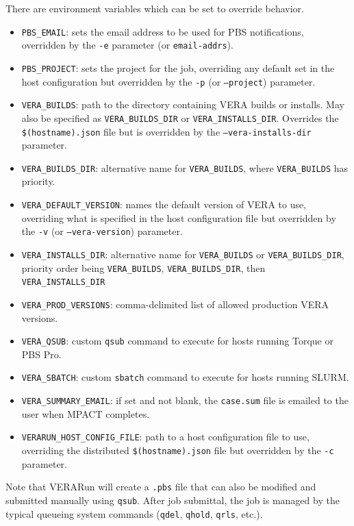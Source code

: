 There are environment variables which can be set to override behavior.
\begin{itemize}
\item \texttt{PBS\_EMAIL}: sets the email address to be used for PBS notifications,
  overridden by the \texttt{-e}  parameter (or \texttt{\-\-email-addrs}).
\item \texttt{PBS\_PROJECT}: sets the project for the job, overriding any default set in
  the host configuration but overridden by the \texttt{-p} (or \texttt{--project}) parameter.
\item \texttt{VERA\_BUILDS}: path to the directory containing VERA builds or installs.  May also be specified as
  \texttt{VERA\_BUILDS\_DIR} or \texttt{VERA\_INSTALLS\_DIR}.
  Overrides the \texttt{\$(hostname).json} file but  is overridden by the
  \texttt{--vera-installs-dir} parameter.
\item \texttt{VERA\_BUILDS\_DIR}: alternative name for \texttt{VERA\_BUILDS}, where \texttt{VERA\_BUILDS} has
  priority.
\item \texttt{VERA\_DEFAULT\_VERSION}: names the default version of VERA to use, overriding
  what is specified in the host configuration file but overridden by the \texttt{-v}
  (or \texttt{--vera-version}) parameter.
\item \texttt{VERA\_INSTALLS\_DIR}: alternative name for \texttt{VERA\_BUILDS} or \texttt{VERA\_BUILDS\_DIR},
  priority order being \texttt{VERA\_BUILDS}, \texttt{VERA\_BUILDS\_DIR}, then \texttt{VERA\_INSTALLS\_DIR}
\item \texttt{VERA\_PROD\_VERSIONS}: comma-delimited list of allowed production VERA versions.
\item \texttt{VERA\_QSUB}: custom \texttt{qsub} command to execute for hosts running Torque or
  PBS Pro.
\item \texttt{VERA\_SBATCH}: custom \texttt{sbatch} command to execute for hosts running SLURM.
\item \texttt{VERA\_SUMMARY\_EMAIL}:  if set and not blank, the \texttt{case.sum} file is emailed
  to the user when MPACT completes.
\item \texttt{VERARUN\_HOST\_CONFIG\_FILE}: path to a host configuration file to use,
  overriding the distributed \texttt{\$(hostname).json} file but overridden by
  the \texttt{-c} parameter.
\end{itemize}

Note that VERARun will create a \texttt{.pbs} file that can also be modified and submitted manually using \texttt{qsub}.
After job submittal, the job is managed by the typical queueing system commands (\texttt{qdel}, \texttt{qhold}, \texttt{qrls}, etc.).

